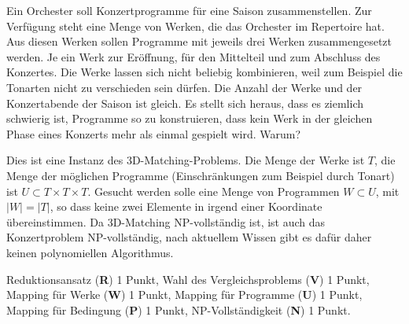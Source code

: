 Ein Orchester soll Konzertprogramme für eine Saison zusammenstellen.
Zur Verfügung steht eine Menge von Werken, die das Orchester im Repertoire hat.
Aus diesen Werken sollen Programme mit jeweils drei Werken zusammengesetzt
werden.
Je ein Werk zur Eröffnung, für den Mittelteil und zum Abschluss des
Konzertes.
Die Werke lassen sich nicht beliebig kombinieren, weil zum Beispiel die
Tonarten nicht zu verschieden sein dürfen.
Die Anzahl der Werke und der Konzertabende der Saison ist gleich.
Es stellt sich heraus, dass es ziemlich schwierig ist, Programme so
zu konstruieren, dass kein Werk in der gleichen Phase eines Konzerts
mehr als einmal gespielt wird.
Warum?

\begin{loesung}
Dies ist eine Instanz des 3D-Matching-Problems.
Die Menge der Werke ist $T$, die Menge der möglichen Programme (Einschränkungen
zum Beispiel durch Tonart) ist $U\subset T\times T\times T$.
Gesucht werden solle eine Menge von Programmen $W\subset U$, mit
$|W|=|T|$, so dass keine zwei Elemente in irgend einer Koordinate
übereinstimmen.
Da 3D-Matching NP-vollständig ist, ist auch das Konzertproblem NP-vollständig,
nach aktuellem Wissen gibt es dafür daher keinen polynomiellen Algorithmus.
\end{loesung}

\begin{bewertung}
Reduktionsansatz ({\bf R}) 1 Punkt,
Wahl des Vergleichsproblems ({\bf V}) 1 Punkt,
Mapping für Werke ({\bf W}) 1 Punkt,
Mapping für Programme ({\bf U}) 1 Punkt,
Mapping für Bedingung ({\bf P}) 1 Punkt,
NP-Vollständigkeit ({\bf N}) 1 Punkt.
\end{bewertung}

